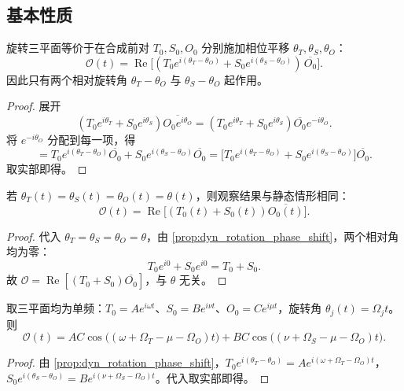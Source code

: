 \subsection{基本性质}

\begin{proposition}[旋转角的相位平移作用]\label{prop:dyn_rotation_phase_shift}
旋转三平面等价于在合成前对 $T_0,S_0,O_0$ 分别施加相位平移 $\theta_T,\theta_S,\theta_O$：
\[
\mathcal O(t)=\operatorname{Re}\!\big[(T_0 e^{i(\theta_T-\theta_O)}+S_0 e^{i(\theta_S-\theta_O)})\,\overline{O_0}\big].
\]
因此只有两个相对旋转角 $\theta_T-\theta_O$ 与 $\theta_S-\theta_O$ 起作用。
\end{proposition}

\begin{proof}
展开
\[
(T_0 e^{i\theta_T}+S_0 e^{i\theta_S})\overline{O_0 e^{i\theta_O}}
=(T_0 e^{i\theta_T}+S_0 e^{i\theta_S})\overline{O_0}e^{-i\theta_O}.
\]
将 $e^{-i\theta_O}$ 分配到每一项，得
\[
=T_0 e^{i(\theta_T-\theta_O)}\overline{O_0}+S_0 e^{i(\theta_S-\theta_O)}\overline{O_0}
=\big[T_0 e^{i(\theta_T-\theta_O)}+S_0 e^{i(\theta_S-\theta_O)}\big]\overline{O_0}.
\]
取实部即得。
\end{proof}

\begin{theorem}[同步旋转下的不变量]\label{thm:dyn_sync_invariance}
若 $\theta_T(t)=\theta_S(t)=\theta_O(t)=\theta(t)$，则观察结果与静态情形相同：
\[
\mathcal O(t)=\operatorname{Re}\!\big[(T_0(t)+S_0(t))\overline{O_0(t)}\big].
\]
\end{theorem}

\begin{proof}
代入 $\theta_T=\theta_S=\theta_O=\theta$，由 \cref{prop:dyn_rotation_phase_shift}，两个相对角均为零：
\[
T_0 e^{i0}+S_0 e^{i0}=T_0+S_0.
\]
故 $\mathcal O=\operatorname{Re}[(T_0+S_0)\overline{O_0}]$，与 $\theta$ 无关。
\end{proof}

\begin{corollary}[异步旋转下的频率平移]\label{cor:dyn_async_beat}
取三平面均为单频：$T_0=A e^{i\omega t}$、$S_0=B e^{i\nu t}$、$O_0=C e^{i\mu t}$，旋转角 $\theta_j(t)=\Omega_j t$。则
\[
\mathcal O(t)=AC\cos\big((\omega+\Omega_T-\mu-\Omega_O)t\big)+BC\cos\big((\nu+\Omega_S-\mu-\Omega_O)t\big).
\]
\end{corollary}

\begin{proof}
由 \cref{prop:dyn_rotation_phase_shift}，$T_0e^{i(\theta_T-\theta_O)}=A e^{i(\omega+\Omega_T-\Omega_O)t}$，$S_0e^{i(\theta_S-\theta_O)}=B e^{i(\nu+\Omega_S-\Omega_O)t}$。代入取实部即得。
\end{proof}

